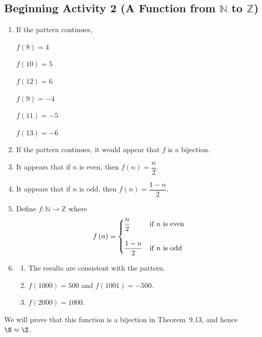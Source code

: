 \documentclass[11pt]{article}
\begin{document}
\newpage
\subsection*{Beginning Activity 2 (A Function from $\boldsymbol{\mathbb{N}}$ to 
$\boldsymbol{\mathbb{Z}}$)}

\begin{enumerate}
\item If the pattern continues, 
\begin{multicols}{2}
$f \left( 8 \right) = 4$

$f \left( 10 \right) = 5$

$f \left( 12 \right) = 6$

$f \left( 9 \right) = -4$

$f \left( 11 \right) = -5$

$f \left( 13 \right) = -6$
\end{multicols}

\item If the pattern continues, it would appear that $f$ is a bijection.

\item It appears that if $n$ is even, then $f \left( n \right) = \dfrac{n}{2}$.

\item It appears that if $n$ is odd, then $f \left( n \right) = \dfrac{1-n}{2}$.

\item Define $f:\mathbb{N} \to \mathbb{Z}$ where
%
\begin{equation} \notag
f \left( n \right) = 
\begin{cases}
\dfrac{n}{2}         &\text{if $n$ is even} \\
                      &                      \\
\dfrac{1-n}{2}       &\text{if $n$ is odd}
\end{cases}
\end{equation}

\item \begin{enumerate}
\item The results are consistent with the pattern.

\item $f \left( 1000 \right) = 500$ and $f \left( 1001 \right) = -500$.

\item $f \left( 2000 \right) = 1000$.
\end{enumerate}
\end{enumerate}
We will prove that this function is a bijection in Theorem~9.13, and hence $\N \approx \Z$.
\hbreak
\end{document}
